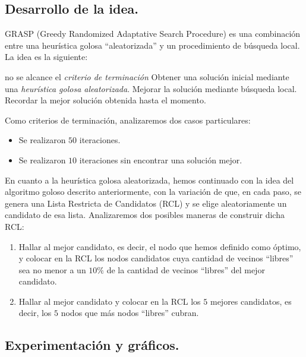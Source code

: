 \subsection{Desarrollo de la idea.}

\vspace*{0.3cm}

GRASP (Greedy Randomized Adaptative Search Procedure) es una combinación entre una heurística golosa ``aleatorizada'' y un procedimiento de búsqueda local.  La idea es la siguiente:

\begin{codebox}
\li \While no se alcance el {\it criterio de terminación}
\li \Do 
		Obtener una solución inicial mediante una {\it heurística golosa aleatorizada}.
\li 		Mejorar la solución mediante búsqueda local.
\li 		Recordar la mejor solución obtenida hasta el momento.
	\End
\end{codebox}

Como criterios de terminación, analizaremos dos casos particulares:

\begin{itemize}
\item Se realizaron $50$ iteraciones.
\item Se realizaron $10$ iteraciones sin encontrar una solución mejor.
\end{itemize}

En cuanto a la heurística golosa aleatorizada, hemos continuado con la idea del algoritmo goloso descrito anteriormente, con la variación de que, en cada paso, se genera una Lista Restricta de Candidatos (RCL) y se elige aleatoriamente un candidato de esa lista.  Analizaremos dos posibles maneras de construir dicha RCL:

\begin{enumerate}
\item Hallar al mejor candidato, es decir, el nodo que hemos definido como óptimo, y colocar en la RCL los nodos candidatos cuya cantidad de vecinos ``libres'' sea no menor a un $10 \%$ de la cantidad de vecinos ``libres'' del mejor candidato.
\item Hallar al mejor candidato y colocar en la RCL los $5$ mejores candidatos, es decir, los $5$ nodos que más nodos ``libres'' cubran.
\end{enumerate}

\vspace*{0.6cm}

\newpage
\subsection{Experimentación y gráficos.}


